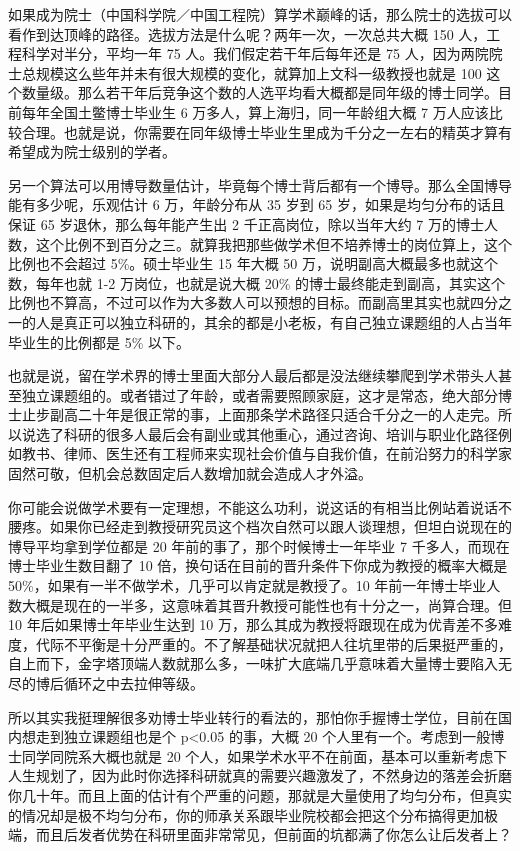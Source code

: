 \documentclass[]{tufte-book}
\begin{document}
如果成为院士（中国科学院／中国工程院）算学术巅峰的话，那么院士的选拔可以看作到达顶峰的路径。选拔方法是什么呢？两年一次，一次总共大概 150 人，工程科学对半分，平均一年 75 人。我们假定若干年后每年还是 75 人，因为两院院士总规模这么些年并未有很大规模的变化，就算加上文科一级教授也就是 100 这个数量级。那么若干年后竞争这个数的人选平均看大概都是同年级的博士同学。目前每年全国土鳖博士毕业生 6 万多人，算上海归，同一年龄组大概 7 万人应该比较合理。也就是说，你需要在同年级博士毕业生里成为千分之一左右的精英才算有希望成为院士级别的学者。

另一个算法可以用博导数量估计，毕竟每个博士背后都有一个博导。那么全国博导能有多少呢，乐观估计 6 万，年龄分布从 35 岁到 65 岁，如果是均匀分布的话且保证 65 岁退休，那么每年能产生出 2 千正高岗位，除以当年大约 7 万的博士人数，这个比例不到百分之三。就算我把那些做学术但不培养博士的岗位算上，这个比例也不会超过 5\%。硕士毕业生 15 年大概 50 万，说明副高大概最多也就这个数，每年也就 1-2 万岗位，也就是说大概 20\% 的博士最终能走到副高，其实这个比例也不算高，不过可以作为大多数人可以预想的目标。而副高里其实也就四分之一的人是真正可以独立科研的，其余的都是小老板，有自己独立课题组的人占当年毕业生的比例都是 5\% 以下。

也就是说，留在学术界的博士里面大部分人最后都是没法继续攀爬到学术带头人甚至独立课题组的。或者错过了年龄，或者需要照顾家庭，这才是常态，绝大部分博士止步副高二十年是很正常的事，上面那条学术路径只适合千分之一的人走完。所以说选了科研的很多人最后会有副业或其他重心，通过咨询、培训与职业化路径例如教书、律师、医生还有工程师来实现社会价值与自我价值，在前沿努力的科学家固然可敬，但机会总数固定后人数增加就会造成人才外溢。

你可能会说做学术要有一定理想，不能这么功利，说这话的有相当比例站着说话不腰疼。如果你已经走到教授研究员这个档次自然可以跟人谈理想，但坦白说现在的博导平均拿到学位都是 20 年前的事了，那个时候博士一年毕业 7 千多人，而现在博士毕业生数目翻了 10 倍，换句话在目前的晋升条件下你成为教授的概率大概是 50\%，如果有一半不做学术，几乎可以肯定就是教授了。10 年前一年博士毕业人数大概是现在的一半多，这意味着其晋升教授可能性也有十分之一，尚算合理。但 10 年后如果博士年毕业生达到 10 万，那么其成为教授将跟现在成为优青差不多难度，代际不平衡是十分严重的。不了解基础状况就把人往坑里带的后果挺严重的，自上而下，金字塔顶端人数就那么多，一味扩大底端几乎意味着大量博士要陷入无尽的博后循环之中去拉伸等级。

所以其实我挺理解很多劝博士毕业转行的看法的，那怕你手握博士学位，目前在国内想走到独立课题组也是个 p\textless0.05 的事，大概 20 个人里有一个。考虑到一般博士同学同院系大概也就是 20 个人，如果学术水平不在前面，基本可以重新考虑下人生规划了，因为此时你选择科研就真的需要兴趣激发了，不然身边的落差会折磨你几十年。而且上面的估计有个严重的问题，那就是大量使用了均匀分布，但真实的情况却是极不均匀分布，你的师承关系跟毕业院校都会把这个分布搞得更加极端，而且后发者优势在科研里面非常常见，但前面的坑都满了你怎么让后发者上？
\end{document}
